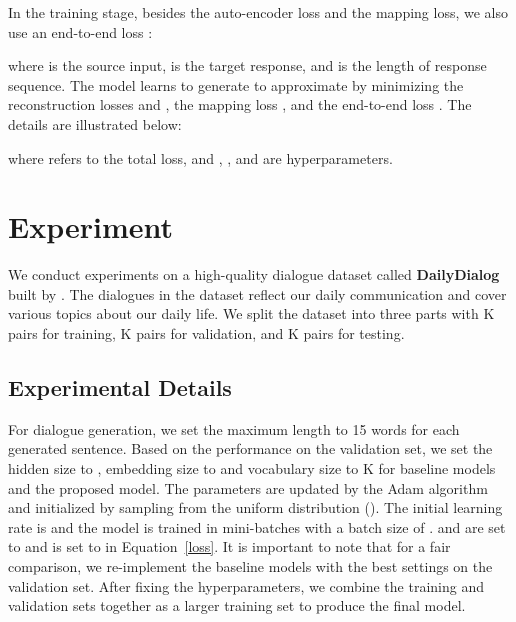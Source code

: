 \documentclass[11pt,a4paper]{article}
\begin{document}
\begin{CJK}{UTF8}{song}
In the training stage, besides the auto-encoder loss and the mapping loss, we also use an end-to-end loss  :


where  is the source input,  is the target response, and  is the length of response sequence.
The model learns to generate  to approximate  by minimizing the reconstruction losses  and , the mapping loss , and the end-to-end loss . The details are illustrated below:

where  refers to the total loss, and , , and  are hyperparameters.











\section{Experiment}





We conduct experiments on a high-quality dialogue dataset called \textbf{DailyDialog} built by \citet{DBLP:conf/ijcnlp/LiSSLCN17}. The dialogues in the dataset reflect our daily communication and cover various topics about our daily life. We split the dataset into three parts with K pairs for training, K pairs for validation, and K pairs for testing.










\subsection{Experimental Details}

For dialogue generation, we set the maximum length to 15 words for each generated sentence.
Based on the performance on the validation set, we set the hidden size to , embedding size to  and vocabulary size to K for baseline models and the proposed model. The parameters are updated by the Adam algorithm~\cite{DBLP:journals/corr/KingmaB14} and initialized by sampling from the uniform distribution (). The initial learning rate is  and the model is trained in mini-batches with a batch size of .  and  are set to  and  is set to  in Equation~\eqref{loss}. It is important to note that for a fair comparison, we re-implement the baseline models with the best settings on the validation set.
After fixing the hyperparameters, we combine the training and validation sets together as a larger training set to produce the final model.







\end{CJK}
\end{document}
